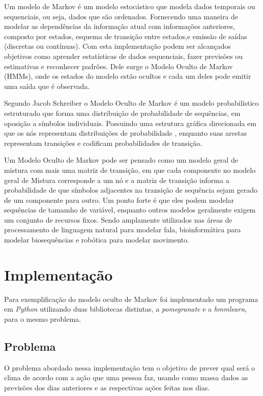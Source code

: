 \documentclass{article}
\begin{document}
Um modelo de Markov é um modelo estocástico que modela dados temporais ou sequenciais, ou seja, dados que são ordenados. Fornecendo uma maneira de modelar as dependências da informação atual com informações anteriores, composto por estados, esquema de transição entre estados,e emissão de saídas (discretas ou contínuas). Com esta implementação podem ser alcançados objetivos como aprender estatísticas de dados sequenciais, fazer previsões ou estimativas e reconhecer padrões. Dele surge o Modelo Oculto de Markov (HMMs), onde os estados do modelo estão ocultos e cada um deles pode emitir uma saída que é observada.

Segundo Jacob Schreiber o Modelo Oculto de Markov é um modelo probabilístico estruturado que forma uma distribuição de probabilidade de sequências, em oposição a símbolos individuais. Possuindo uma estrutura gráfica direcionada em que os nós representam distribuições de probabilidade , enquanto suas arestas representam transições e codificam probabilidades de transição. 

Um Modelo Oculto de Markov pode ser pensado como um modelo geral de mistura com mais uma matriz de transição, em que cada componente no modelo geral de Mistura corresponde a um nó  e a matriz de transição informa a probabilidade de que símbolos adjacentes na transição de sequência sejam gerado de um componente para outro. Um ponto forte é que eles podem modelar sequências de tamamho de variável, enquanto outros modelos geralmente exigem um conjunto de recursos fixos. Sendo amplamente utilizados nas áreas de processamento de linguagem natural para modelar fala, bioinformática para modelar biosequências e robótica para modelar movimento.

\section{Implementação}
Para exemplificação do modelo oculto de Markov foi implementado um programa em \emph{Python} utilizando duas bibliotecas distintas, a \emph{pomegranate} e a \emph{hmmlearn}, para o mesmo problema. 

\subsection{Problema}
O problema abordado nessa implementação tem o objetivo de prever qual será o clima de acordo com a ação que uma pessoa faz, usando como massa dados as previsões dos dias anteriores e as respectivas ações feitas nos dias.
\end{document}
